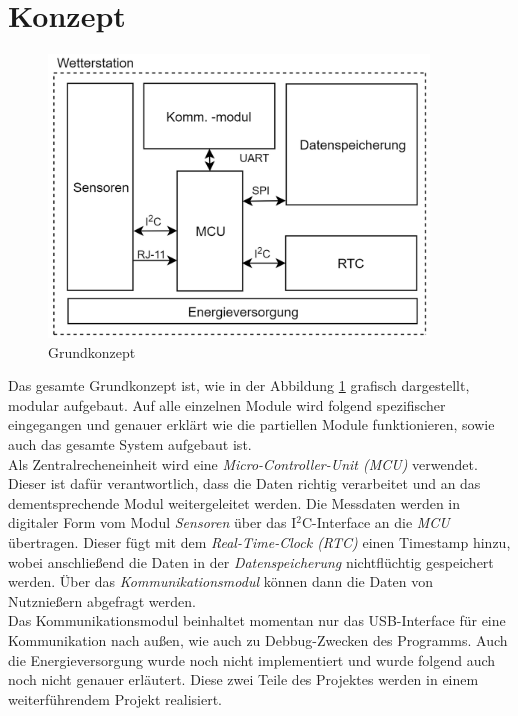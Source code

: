 \section{Konzept} \label{chap:konzept}

\begin{figure}[hbtp]
\centering
\includegraphics[width=0.9\textwidth]{graphics/Konzeptdiagramme/Grundkonzept.PNG}
\caption{Grundkonzept}
\label{fig:grundkonzept}
\end{figure}


Das gesamte Grundkonzept ist, wie in der Abbildung \ref{fig:grundkonzept} grafisch dargestellt, modular aufgebaut. Auf alle einzelnen Module wird folgend spezifischer eingegangen und genauer erklärt wie die partiellen Module funktionieren, sowie auch das gesamte System aufgebaut ist.\\

Als Zentralrecheneinheit wird eine \textit{Micro-Controller-Unit (MCU)} verwendet. Dieser ist dafür verantwortlich, dass die Daten richtig verarbeitet und an das dementsprechende Modul weitergeleitet werden. Die Messdaten werden in digitaler Form vom Modul \textit{Sensoren} über das I$^{2}$C-Interface an die \textit{MCU} übertragen. Dieser fügt mit dem \textit{Real-Time-Clock (RTC)} einen Timestamp hinzu, wobei anschließend die Daten in der \textit{Datenspeicherung} nichtflüchtig gespeichert werden. Über das \textit{Kommunikationsmodul} können dann die Daten von Nutznießern abgefragt werden.\\

Das Kommunikationsmodul beinhaltet momentan nur das USB-Interface für eine Kommunikation nach außen, wie auch zu Debbug-Zwecken des Programms. Auch die Energieversorgung wurde noch nicht implementiert und wurde folgend auch noch nicht genauer erläutert. Diese zwei Teile des Projektes werden in einem weiterführendem Projekt realisiert.\\

